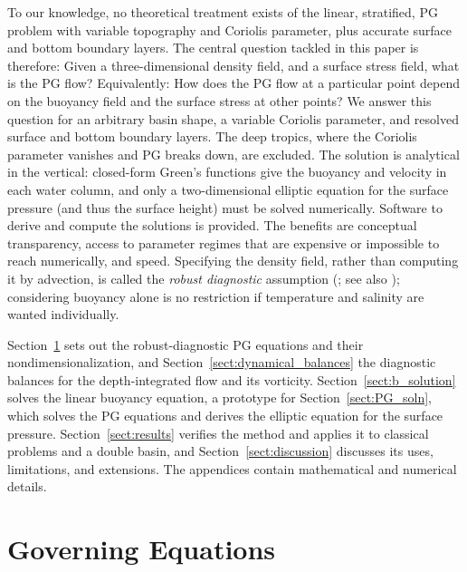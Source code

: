 \documentclass{ametsocV6.2}
\begin{document}
To our knowledge, no theoretical treatment exists of the linear, stratified, PG problem with variable topography and Coriolis parameter, plus accurate surface and bottom boundary layers.
The central question tackled in this paper is therefore: Given a three-dimensional density field, and a surface stress field, what is the PG flow? 
Equivalently: How does the PG flow at a particular point depend on the buoyancy field and the surface stress at other points?
We answer this question for an arbitrary basin shape, a variable Coriolis parameter, and resolved surface and bottom boundary layers.
The deep tropics, where the Coriolis parameter vanishes and PG breaks down, are excluded.
The solution is analytical in the vertical: closed-form Green's functions give the buoyancy and velocity in each water column, and only a two-dimensional elliptic equation for the surface pressure (and thus the surface height) must be solved numerically. Software to derive and compute the solutions is provided. The benefits are conceptual transparency, access to parameter regimes that are expensive or impossible to reach numerically, and speed. 
Specifying the density field, rather than computing it by advection, is called the \emph{robust diagnostic} assumption (\citealt{sarmiento&bryan82}; see also \citealt{bogden_etal93,park&guernier01,nost&isachsen03,nilsson_etal05}); considering buoyancy alone is no restriction if temperature and salinity are wanted individually.

Section~\ref{sect:equations} sets out the robust-diagnostic PG equations and their nondimensionalization, and Section~\ref{sect:dynamical_balances} the diagnostic balances for the depth-integrated flow and its vorticity. Section~\ref{sect:b_solution} solves the linear buoyancy equation, a prototype for Section~\ref{sect:PG_soln}, which solves the PG equations and derives the elliptic equation for the surface pressure. Section~\ref{sect:results} verifies the method and applies it to classical problems and a double basin, and Section~\ref{sect:discussion} discusses its uses, limitations, and extensions. The appendices contain mathematical and numerical details.


\section{Governing Equations}
\label{sect:equations}
\end{document}
